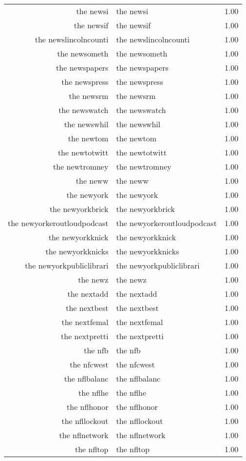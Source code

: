 \begin{table}[ht]
\begin{tabular}{rlr}
  the newsi & the newsi & 1.00 \\ 
  the newsif & the newsif & 1.00 \\ 
  the newslincolncounti & the newslincolncounti & 1.00 \\ 
  the newsometh & the newsometh & 1.00 \\ 
  the newspapers & the newspapers & 1.00 \\ 
  the newspress & the newspress & 1.00 \\ 
  the newsrm & the newsrm & 1.00 \\ 
  the newswatch & the newswatch & 1.00 \\ 
  the newswhil & the newswhil & 1.00 \\ 
  the newtom & the newtom & 1.00 \\ 
  the newtotwitt & the newtotwitt & 1.00 \\ 
  the newtromney & the newtromney & 1.00 \\ 
  the neww & the neww & 1.00 \\ 
  the newyork & the newyork & 1.00 \\ 
  the newyorkbrick & the newyorkbrick & 1.00 \\ 
  the newyorkeroutloudpodcast & the newyorkeroutloudpodcast & 1.00 \\ 
  the newyorkknick & the newyorkknick & 1.00 \\ 
  the newyorkknicks & the newyorkknicks & 1.00 \\ 
  the newyorkpubliclibrari & the newyorkpubliclibrari & 1.00 \\ 
  the newz & the newz & 1.00 \\ 
  the nextadd & the nextadd & 1.00 \\ 
  the nextbest & the nextbest & 1.00 \\ 
  the nextfemal & the nextfemal & 1.00 \\ 
  the nextpretti & the nextpretti & 1.00 \\ 
  the nfb & the nfb & 1.00 \\ 
  the nfcwest & the nfcwest & 1.00 \\ 
  the nflbalanc & the nflbalanc & 1.00 \\ 
  the nflhe & the nflhe & 1.00 \\ 
  the nflhonor & the nflhonor & 1.00 \\ 
  the nfllockout & the nfllockout & 1.00 \\ 
  the nflnetwork & the nflnetwork & 1.00 \\ 
  the nfltop & the nfltop & 1.00 \\ 

\end{tabular}
\end{table}
